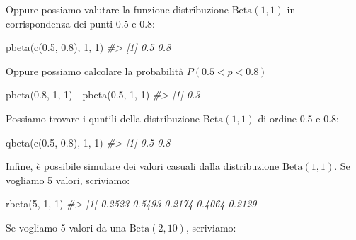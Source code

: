 \documentclass[
  11pt,
]{krantz}
\makeatletter
\newenvironment{Shaded}{\begin{snugshade}}{\end{snugshade}}
\newcommand{\CommentTok}[1]{\textcolor[rgb]{0.37,0.37,0.37}{\textit{#1}}}
\newcommand{\DecValTok}[1]{\textcolor[rgb]{0.06,0.06,0.06}{#1}}
\newcommand{\FloatTok}[1]{\textcolor[rgb]{0.06,0.06,0.06}{#1}}
\newcommand{\FunctionTok}[1]{\textcolor[rgb]{0,0,0}{#1}}
\newcommand{\NormalTok}[1]{#1}
\newcommand{\SpecialCharTok}[1]{\textcolor[rgb]{0,0,0}{#1}}
\newenvironment{kframe}{%
\medskip{}
\setlength{\fboxsep}{.8em}
 \def\at@end@of@kframe{}%
 \ifinner\ifhmode%
  \def\at@end@of@kframe{\end{minipage}}%
  \begin{minipage}{\columnwidth}%
 \fi\fi%
 \def\FrameCommand##1{\hskip\@totalleftmargin \hskip-\fboxsep
 \colorbox{shadecolor}{##1}\hskip-\fboxsep
     \hskip-\linewidth \hskip-\@totalleftmargin \hskip\columnwidth}%
 \MakeFramed {\advance\hsize-\width
   \@totalleftmargin\z@ \linewidth\hsize
   \@setminipage}}%
 {\par\unskip\endMakeFramed%
 \at@end@of@kframe}
\renewenvironment{Shaded}{\begin{kframe}}{\end{kframe}}
\theoremstyle{definition}
\theoremstyle{definition}
\theoremstyle{definition}
\theoremstyle{definition}
\theoremstyle{remark}
\makeatother
\begin{document}
Oppure possiamo valutare la funzione distribuzione \(\mbox{Beta}(1, 1)\) in corrispondenza dei punti 0.5 e 0.8:

\begin{Shaded}
\begin{Highlighting}[]
\FunctionTok{pbeta}\NormalTok{(}\FunctionTok{c}\NormalTok{(}\FloatTok{0.5}\NormalTok{, }\FloatTok{0.8}\NormalTok{), }\DecValTok{1}\NormalTok{, }\DecValTok{1}\NormalTok{)}
\CommentTok{\#\textgreater{} [1] 0.5 0.8}
\end{Highlighting}
\end{Shaded}

Oppure possiamo calcolare la probabilità \(P(0.5 < p < 0.8)\)

\begin{Shaded}
\begin{Highlighting}[]
\FunctionTok{pbeta}\NormalTok{(}\FloatTok{0.8}\NormalTok{, }\DecValTok{1}\NormalTok{, }\DecValTok{1}\NormalTok{) }\SpecialCharTok{{-}} \FunctionTok{pbeta}\NormalTok{(}\FloatTok{0.5}\NormalTok{, }\DecValTok{1}\NormalTok{, }\DecValTok{1}\NormalTok{)}
\CommentTok{\#\textgreater{} [1] 0.3}
\end{Highlighting}
\end{Shaded}

Possiamo trovare i quntili della distribuzione \(\mbox{Beta}(1, 1)\) di ordine 0.5 e 0.8:

\begin{Shaded}
\begin{Highlighting}[]
\FunctionTok{qbeta}\NormalTok{(}\FunctionTok{c}\NormalTok{(}\FloatTok{0.5}\NormalTok{, }\FloatTok{0.8}\NormalTok{), }\DecValTok{1}\NormalTok{, }\DecValTok{1}\NormalTok{)}
\CommentTok{\#\textgreater{} [1] 0.5 0.8}
\end{Highlighting}
\end{Shaded}

Infine, è possibile simulare dei valori casuali dalla distribuzione \(\mbox{Beta}(1, 1)\). Se vogliamo 5 valori, scriviamo:

\begin{Shaded}
\begin{Highlighting}[]
\FunctionTok{rbeta}\NormalTok{(}\DecValTok{5}\NormalTok{, }\DecValTok{1}\NormalTok{, }\DecValTok{1}\NormalTok{)}
\CommentTok{\#\textgreater{} [1] 0.2523 0.5493 0.2174 0.4064 0.2129}
\end{Highlighting}
\end{Shaded}

Se vogliamo 5 valori da una \(\mbox{Beta}(2, 10)\), scriviamo:
\end{document}
